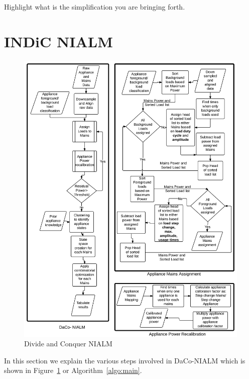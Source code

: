 \documentclass[conference]{IEEEtran}
\newcommand{\figref}[1]{Figure~\ref{#1}}
\newcommand{\algoref}[1]{Algorithm~\ref{#1}}
\begin{document}
Highlight what is the simplification you are bringing forth.

\section{INDiC NIALM}
\begin{figure}
\centering \includegraphics[scale=0.1]{./figures/algo_3.png}
\caption{Divide and Conquer NIALM}
   \label{fig:algorithm}
\end{figure}
In this section we explain the various steps involved in DaCo-NIALM which is shown in \figref{fig:algorithm} or \algoref{algo:main}.
\end{document}
